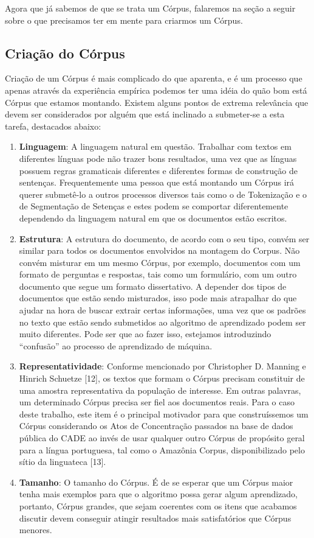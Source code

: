 \documentclass[11pt]{report}
\newcommand{\quotes}[1]{``#1''}
\begin{document}
Agora que já sabemos de que se trata um Córpus, falaremos na seção a seguir sobre o que precisamos ter em mente para criarmos um Córpus.

\subsection{Criação do Córpus}

\indent\indent Criação de um Córpus é mais complicado do que aparenta, e é um processo que apenas através da experiência empírica podemos ter uma idéia do
quão bom está Córpus que estamos montando. Existem alguns pontos de extrema relevância que devem ser considerados por alguém que está inclinado a submeter-se a esta
tarefa, destacados abaixo:

\begin{enumerate}[label=\textbf{\arabic*.}]
  \item \textbf{Linguagem}: A linguagem natural em questão. Trabalhar com textos em diferentes línguas pode não trazer bons resultados, uma vez que as línguas possuem regras
  gramaticais diferentes e diferentes formas de construção de sentenças. Frequentemente uma pessoa que está montando um Córpus irá querer submetê-lo a outros processos diversos
  tais como o de Tokenização e o de Segmentação de Setenças e estes podem se comportar diferentemente dependendo da linguagem natural em que os documentos estão escritos.
  \item \textbf{Estrutura}: A estrutura do documento, de acordo com o seu tipo, convém ser similar para todos os documentos envolvidos na montagem do Corpus. Não convém
  misturar em um mesmo Córpus, por exemplo, documentos com um formato de perguntas e respostas, tais como um formulário, com um outro documento que segue um formato dissertativo.
  A depender dos tipos de documentos que estão sendo misturados, isso pode mais atrapalhar do que ajudar na hora de buscar extrair certas informações, uma vez que os padrões
  no texto que estão sendo submetidos ao algoritmo de aprendizado podem ser muito diferentes. Pode ser que ao fazer isso, estejamos introduzindo \quotes{confusão} ao processo
  de aprendizado de máquina.
  \item \textbf{Representatividade}: Conforme mencionado por Christopher D. Manning e Hinrich Schuetze [12], os textos que formam o Córpus precisam constituir de uma amostra
  representativa da população de interesse. Em outras palavras, um determinado Córpus precisa ser fiel aos documentos reais. Para o caso deste trabalho, este item é o principal
  motivador para que construíssemos um Córpus considerando os Atos de Concentração passados na base de dados pública do CADE ao invés de usar qualquer outro Córpus de propósito
  geral para a língua portuguesa, tal como o Amazônia Corpus, disponibilizado pelo sítio da linguateca [13].
  \item \textbf{Tamanho}: O tamanho do Córpus. É de se esperar que um Córpus maior tenha mais exemplos para que o algoritmo possa gerar algum aprendizado, portanto, Córpus grandes,
  que sejam coerentes com os itens que acabamos discutir devem conseguir atingir resultados mais satisfatórios que Córpus menores.
\end{enumerate}
\end{document}
